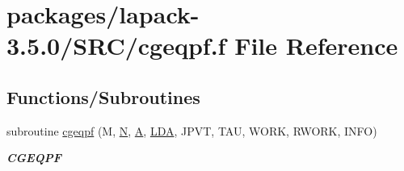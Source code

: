 \hypertarget{cgeqpf_8f}{}\section{packages/lapack-\/3.5.0/\+S\+R\+C/cgeqpf.f File Reference}
\label{cgeqpf_8f}
\subsection*{Functions/\+Subroutines}
\begin{DoxyCompactItemize}
\item 
subroutine \hyperlink{group__complexGEcomputational_gab3dc4404de0aff42eebca8b7bc8de6f3}{cgeqpf} (M, \hyperlink{polmisc_8c_a0240ac851181b84ac374872dc5434ee4}{N}, \hyperlink{classA}{A}, \hyperlink{example__user_8c_ae946da542ce0db94dced19b2ecefd1aa}{L\+D\+A}, J\+P\+V\+T, T\+A\+U, W\+O\+R\+K, R\+W\+O\+R\+K, I\+N\+F\+O)
\begin{DoxyCompactList}\small\item\em {\bfseries C\+G\+E\+Q\+P\+F} \end{DoxyCompactList}\end{DoxyCompactItemize}
